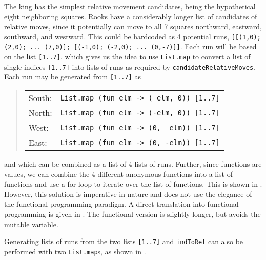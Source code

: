 \documentclass[fsharpnotes.tex]{subfiles}
\begin{document}
The king has the simplest relative movement candidates, being the hypothetical eight neighboring squares. Rooks have a considerably longer list of candidates of relative moves, since it potentially can move to all 7 squares northward, eastward, southward, and westward. This could be hardcoded as 4 potential runs, \lstinline{[[(1,0); (2,0); ... (7,0)]; [(-1,0); (-2,0); ... (0,-7)]]}. Each run will be based on the list \lstinline{[1..7]}, which gives us the idea to use \lstinline{List.map} to convert a list of single indices \lstinline{[1..7]} into lists of runs as required by \lstinline{candidateRelativeMoves}. Each run may be generated from \lstinline{[1..7]} as
\begin{quote}
  \begin{tabular}{ll}
    South:& \lstinline!List.map (fun elm -> ( elm, 0)) [1..7]! \\
    North:& \lstinline!List.map (fun elm -> (-elm, 0)) [1..7]!  \\
    West:& \lstinline!List.map (fun elm -> (0,  elm)) [1..7]! \\
    East:& \lstinline!List.map (fun elm -> (0, -elm)) [1..7]! 
  \end{tabular}
\end{quote}
and which can be combined as a list of 4 lists of runs. Further, since functions are values, we can combine the 4 different anonymous functions into a list of functions and use a for-loop to iterate over the list of functions. This is shown in .
%
%
However, this solution is imperative in nature and does not use the elegance of the functional programming paradigm. A direct translation into functional programming is given in .
%
%
The functional version is slightly longer, but avoids the mutable variable.

Generating lists of runs from the two lists \lstinline{[1..7]} and \lstinline{indToRel} can also be performed with two \lstinline{List.map}s, as shown in .
\end{document}
